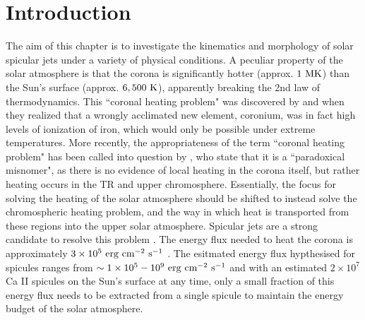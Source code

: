 \section{Introduction}
\label{sec:c2intro}
The aim of this chapter is to investigate the kinematics and morphology of solar spicular jets under a variety of physical conditions. A peculiar property of the solar atmosphere is that the corona is significantly hotter (approx. $1~\rm{MK}$) than the Sun's surface (approx. $6,500~\rm{K}$), apparently breaking the 2nd law of thermodynamics. This ``coronal heating problem" was discovered by \cite{Grotrian1939} and \cite{Edl1943} when they realized that a wrongly acclimated new element, coronium, was in fact high levels of ionization of iron, which would only be possible under extreme temperatures. More recently, the appropriateness of the term ``coronal heating problem" has been called into question by \cite{Aschwanden2007ApJ}, who state that it is a ``paradoxical misnomer", as there is no evidence of local heating in the corona itself, but rather heating occurs in the TR and upper chromosphere. Essentially, the focus for solving the heating of the solar atmosphere should be shifted to instead solve the chromospheric heating problem, and the way in which heat is transported from these regions into the upper solar atmosphere. Spicular jets are a strong candidate to resolve this problem \citep{Kudoh1999ApJ514493K, Pontieu2007PASJ, Martinez-Sykora2017,Moore2011ApJ731L18M, Pontieu2017ApJ, Samanta2019Sci, Zuo2019AcASn, Bale2019Natur}. The energy flux needed to heat the corona is approximately $3\times10^{5}~\rm{erg~cm^{-2}~s^{-1}}$ \citep{Withbroe1977ARAA15363W}. The esitmated energy flux hypthesised for spicules ranges from $\sim 1\times10^5-10^9~\rm{erg~cm^{-2}~s^{-1}}$  \citep{Athay1982ApJ255743A,Zaqarashvili_2009SSRv,dePontieu2011Sci33155D} and with an estimated $2 \times 10^{7}$ \citep{Judge_2010ApJ} Ca II spicules on the Sun's surface at any time, only a small fraction of this energy flux needs to be extracted from a single spicule to maintain the energy budget of the solar atmosphere. \np
%
